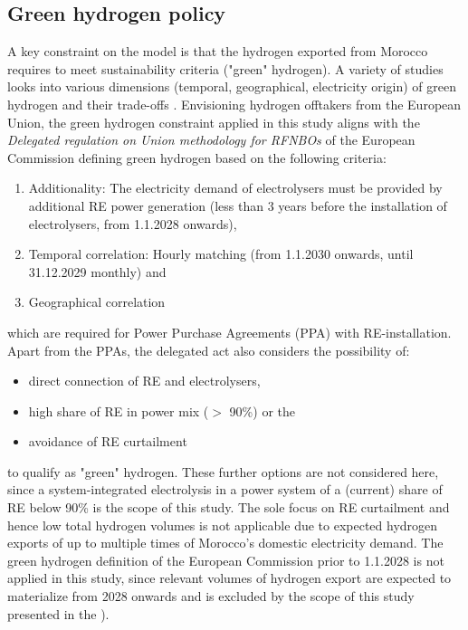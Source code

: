 \subsection*{Green hydrogen policy}
\label{subsec:green_hydrogen_constraint}


A key constraint on the model is that the hydrogen exported from Morocco requires to meet sustainability criteria ("green" hydrogen). A variety of studies looks into various dimensions (temporal, geographical, electricity origin) of green hydrogen and their trade-offs \cite{Brauer2022, Ruhnau2022, Zeyen2024}.
Envisioning hydrogen offtakers from the European Union, the green hydrogen constraint applied in this study aligns with the \emph{Delegated regulation on Union methodology for RFNBOs} of the European Commission \cite{Commission2023} defining green hydrogen  based on the following criteria:

\begin{enumerate}
    \item Additionality: The electricity demand of electrolysers must be provided by additional RE power generation (less than 3 years before the installation of electrolysers, from 1.1.2028 onwards),
    \item Temporal correlation: Hourly matching (from 1.1.2030 onwards, until 31.12.2029 monthly) and
    \item Geographical correlation
\end{enumerate}
which are required for Power Purchase Agreements (PPA) with RE-installation. Apart from the PPAs, the delegated act also considers the possibility of:
\begin{itemize}
    \item direct connection of RE and electrolysers,
    \item high share of RE in power mix ($>$ 90\%) or the
    \item avoidance of RE curtailment
\end{itemize}
to qualify as "green" hydrogen. These further options are not considered here, since a system-integrated electrolysis in a power system of a (current) share of RE below 90\% is the scope of this study. The sole focus on RE curtailment and hence low total hydrogen volumes is not applicable due to expected hydrogen exports of up to multiple times of Morocco's domestic electricity demand. The green hydrogen definition of the European Commission prior to 1.1.2028 is not applied in this study, since relevant volumes of hydrogen export are expected to materialize from 2028 onwards and is excluded by the scope of this study presented in the ).


